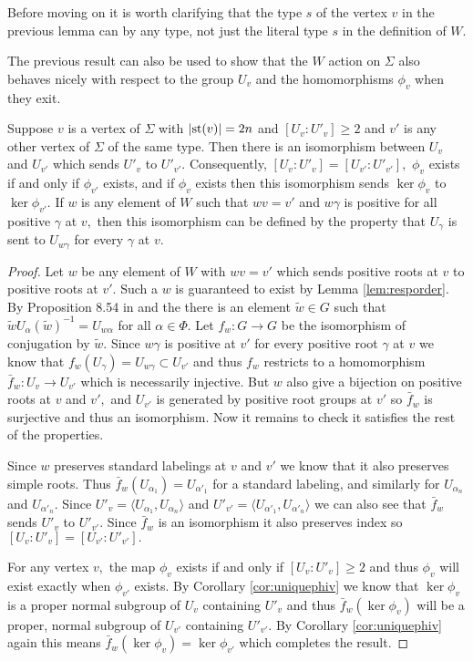 \documentclass[class=book, crop=false,12 pt]{standalone}
\begin{document}
Before moving on it is worth clarifying that the type $s$ of the vertex $v$ in the previous lemma can by any type, not just the literal type $s$ in the definition of $W.$

The previous result can also be used to show that the $W$ action on $\Sigma$ also behaves nicely with respect to the group $U_v$ and the homomorphisms $\phi_v$ when they exit.
\begin{cor}
	\label{cor:respectphiv}
	Suppose $v$ is a vertex of $\Sigma$ with $|\mathrm{st}(v)|=2n$ and $[U_v:U'_v]\ge 2$ and $v'$ is any other vertex of $\Sigma$ of the same type. Then there is an isomorphism between $U_v$ and $U_{v'}$ which sends $U'_v$ to $U'_{v'}.$ Consequently, $[U_v:U'_v]=[U_{v'}:U'_{v'}],$ $\phi_v$ exists if and only if $\phi_{v'}$ exists, and if $\phi_v$ exists then this isomorphism sends $\ker \phi_v$ to $\ker \phi_{v'}.$ If $w$ is any element of $W$ such that $wv=v'$ and $w\gamma$ is positive for all positive $\gamma$ at $v,$ then this isomorphism can be defined by the property that $U_\gamma$ is sent to $U_{w\gamma}$ for every $\gamma$ at $v.$
\end{cor}
\begin{proof}
	Let $w$ be any element of $W$ with $wv=v'$ which sends positive roots at $v$ to positive roots at $v'.$ Such a $w$ is guaranteed to exist by Lemma \ref{lem:resporder}. By Proposition 8.54 in \cite{buildings} and the there is an element $\tilde{w}\in G$ such that $\tilde{w}U_\alpha (\tilde{w})^{-1}=U_{w\alpha}$ for all $\alpha\in \Phi.$ Let $f_w:G\to G$ be the isomorphism of conjugation by $\tilde{w}.$ Since $w\gamma$ is positive at $v'$ for every positive root $\gamma$ at $v$ we know that $f_w(U_\gamma)=U_{w\gamma}\subset U_{v'}$ and thus $f_w$ restricts to a homomorphism $\bar{f}_w:U_v\to U_{v'}$ which is necessarily injective. But $w$ also give a bijection on positive roots at $v$ and $v',$ and $U_{v'}$ is generated by positive root groups at $v'$ so $\bar{f}_w$ is surjective and thus an isomorphism. Now it remains to check it satisfies the rest of the properties. 

	Since $w$ preserves standard labelings at $v$ and $v'$ we know that it also preserves simple roots. Thus $\bar{f}_w(U_{\alpha_1})=U_{\alpha'_1}$ for a standard labeling, and similarly for $U_{\alpha_n}$ and $U_{\alpha'_n}.$ Since $U'_v=\langle U_{\alpha_1},U_{\alpha_n}\rangle$ and $U'_{v'}=\langle U_{\alpha'_1},U_{\alpha'_n}\rangle$ we can also see that $\bar{f}_w$ sends $U'_v$ to $U'_{v'}.$ Since $\bar{f}_w$ is an isomorphism it also preserves index so $[U_v:U'_v]=[U_{v'}:U'_{v'}].$

	For any vertex $v,$ the map $\phi_v$ exists if and only if $[U_v:U'_v]\ge 2$ and thus $\phi_v$ will exist exactly when $\phi_{v'}$ exists. By Corollary \ref{cor:uniquephiv} we know that $\ker \phi_v$ is a proper normal subgroup of $U_v$ containing $U'_v$ and thus $\bar{f}_w(\ker \phi_v)$ will be a proper, normal subgroup of $U_{v'}$ containing $U'_{v'}.$ By Corollary \ref{cor:uniquephiv} again this means $\bar{f}_w(\ker \phi_v)=\ker \phi_{v'}$ which completes the result.
\end{proof}
\end{document}
